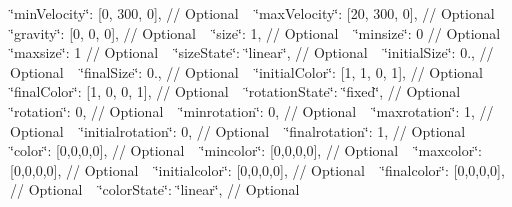 \begin{DoxyCompactList}
{ \char`\"{}min\+Velocity\char`\"{}\+: \mbox{[}0, 300, 0\mbox{]}, // Optional ~\newline
 \char`\"{}max\+Velocity\char`\"{}\+: \mbox{[}20, 300, 0\mbox{]}, // Optional ~\newline
 \char`\"{}gravity\char`\"{}\+: \mbox{[}0, 0, 0\mbox{]}, // Optional ~\newline
 \char`\"{}size\char`\"{}\+: 1, // Optional ~\newline
 \char`\"{}minsize\char`\"{}\+: 0 // Optional ~\newline
 \char`\"{}maxsize\char`\"{}\+: 1 // Optional ~\newline
 \char`\"{}size\+State\char`\"{}\+: \char`\"{}linear\char`\"{}, // Optional ~\newline
 \char`\"{}initial\+Size\char`\"{}\+: 0., // Optional ~\newline
 \char`\"{}final\+Size\char`\"{}\+: 0., // Optional ~\newline
 \char`\"{}initial\+Color\char`\"{}\+: \mbox{[}1, 1, 0, 1\mbox{]}, // Optional ~\newline
 \char`\"{}final\+Color\char`\"{}\+: \mbox{[}1, 0, 0, 1\mbox{]}, // Optional ~\newline
 \char`\"{}rotation\+State\char`\"{}\+: \char`\"{}fixed\char`\"{}, // Optional ~\newline
 \char`\"{}rotation\char`\"{}\+: 0, // Optional ~\newline
 \char`\"{}minrotation\char`\"{}\+: 0, // Optional ~\newline
 \char`\"{}maxrotation\char`\"{}\+: 1, // Optional ~\newline
 \char`\"{}initialrotation\char`\"{}\+: 0, // Optional ~\newline
 \char`\"{}finalrotation\char`\"{}\+: 1, // Optional ~\newline
 \char`\"{}color\char`\"{}\+: \mbox{[}0,0,0,0\mbox{]}, // Optional ~\newline
 \char`\"{}mincolor\char`\"{}\+: \mbox{[}0,0,0,0\mbox{]}, // Optional ~\newline
 \char`\"{}maxcolor\char`\"{}\+: \mbox{[}0,0,0,0\mbox{]}, // Optional ~\newline
 \char`\"{}initialcolor\char`\"{}\+: \mbox{[}0,0,0,0\mbox{]}, // Optional ~\newline
 \char`\"{}finalcolor\char`\"{}\+: \mbox{[}0,0,0,0\mbox{]}, // Optional ~\newline
 \char`\"{}color\+State\char`\"{}\+: \char`\"{}linear\char`\"{}, // Optional ~\newline
}
\end{DoxyCompactList}
